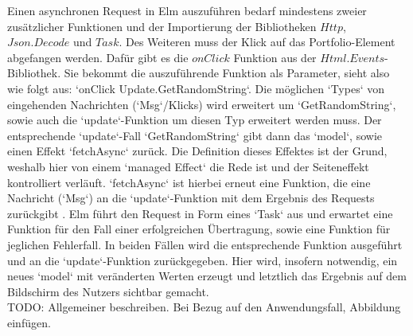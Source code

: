 Einen asynchronen Request in Elm auszuführen bedarf mindestens zweier zusätzlicher Funktionen und der Importierung der Bibliotheken $Http$, $Json.Decode$ und $Task$. Des Weiteren muss der Klick auf das Portfolio-Element abgefangen werden. Dafür gibt es die $onClick$ Funktion aus der $Html.Events$-Bibliothek. Sie bekommt die auszuführende Funktion als Parameter, sieht also wie folgt aus: `onClick Update.GetRandomString`. Die möglichen `Types` von eingehenden Nachrichten (`Msg`/Klicks) wird erweitert um `GetRandomString`, sowie auch die `update`-Funktion um diesen Typ erweitert werden muss. Der entsprechende `update`-Fall `GetRandomString` gibt dann das `model`, sowie einen Effekt `fetchAsync` zurück. Die Definition dieses Effektes ist der Grund, weshalb hier von einem `managed Effect` die Rede ist und der Seiteneffekt kontrolliert verläuft. `fetchAsync` ist hierbei erneut eine Funktion, die eine Nachricht (`Msg`) an die `update`-Funktion mit dem Ergebnis des Requests zurückgibt . Elm führt den Request in Form eines `Task` aus und erwartet eine Funktion für den Fall einer erfolgreichen Übertragung, sowie eine Funktion für jeglichen Fehlerfall. In beiden Fällen wird die entsprechende Funktion ausgeführt und an die `update`-Funktion zurückgegeben. Hier wird, insofern notwendig, ein neues `model` mit veränderten Werten erzeugt und letztlich das Ergebnis auf dem Bildschirm des Nutzers sichtbar gemacht.\\
TODO: Allgemeiner beschreiben. Bei Bezug auf den Anwendungsfall, Abbildung einfügen.


